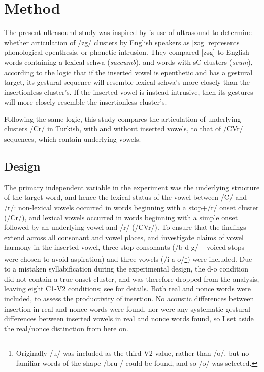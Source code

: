 \documentclass[output=paper,colorlinks,citecolor=brown]{langscibook}
\begin{document}
\section{Method}

The present ultrasound study was inspired by \citet{DavidsonStone2003}'s use of ultrasound to determine whether articulation of /zg/ clusters by English speakers as [z\textsf{ə}g] represents phonological epenthesis, or phonetic intrusion. They compared [z\textsf{ə}g] to English words containing a lexical schwa (\textit{succumb}), and words with sC clusters (\textit{scum}), according to the logic that if the inserted vowel is epenthetic and has a gestural target, its gestural sequence will resemble lexical schwa’s more closely than the insertionless cluster’s. If the inserted vowel is instead intrusive, then its gestures will more closely resemble the insertionless cluster’s.

Following the same logic, this study compares the articulation of underlying clusters /Cr/ in Turkish, with and without inserted vowels, to that of /CVr/ sequences, which contain underlying vowels.

\subsection{Design}
The primary independent variable in the experiment was the underlying structure of the target word, and hence the lexical status of the vowel between /C/ and /r/: non-lexical vowels occurred in words beginning with a stop+/r/ onset cluster (/Cr/), and lexical vowels occurred in words beginning with a simple onset followed by an underlying vowel and /r/ (/CVr/). To ensure that the findings extend across all consonant and vowel places, and investigate claims of vowel harmony in the inserted vowel, three stop consonants (/b d g/ – voiced stops were chosen to avoid aspiration) and three vowels (/i a o/\footnote{Originally /u/ was included as the third V2 value, rather than /o/, but no familiar words of the shape /bru-/ could be found, and so /o/ was selected.}) were included. Due to a mistaken syllabification during the experimental design, the d-o condition did not contain a true onset cluster, and was therefore dropped from the analysis, leaving eight C1-V2 conditions; see \citet[39]{Bellik2019a} for details. Both real and nonce words were included, to assess the productivity of insertion. No acoustic differences between insertion in real and nonce words were found, nor were any systematic gestural differences between inserted vowels in real and nonce words found, so I set aside the real/nonce distinction from here on.
\end{document}
